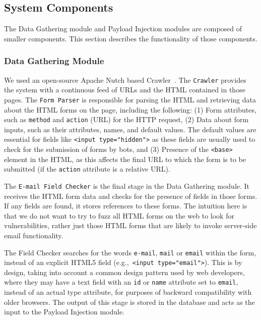 \subsection{System Components}

\label{Comp}
\label{Comp:Crawler}
\label{Comp:EMFR}
\label{Comp:Fuzzer}
\label{Comp:EMA}
The Data Gathering module and Payload Injection modules are composed of smaller components. This section describes the functionality of those components.

\subsubsection{Data Gathering Module}
We used an open-source Apache Nutch based Crawler~\cite{nutch}. The \lstinline{Crawler} provides the system with a continuous feed of URLs and the HTML contained in those pages. 
\label{Comp:FP}
The \lstinline{Form Parser} is responsible for parsing the HTML and retrieving data about the HTML
forms on the page, including the following: (1) Form attributes, such
as \lstinline{method} and \lstinline{action} (URL) for the HTTP request, (2)
Data about form inputs, such as their attributes, names, and
default values. The default values are essential for fields like
{\lstinline{<input type="hidden">}} as these fields are usually used
to check for the submission of forms by bots, and (3) Presence of the {\lstinline{<base>}} element in the HTML, as this affects the final URL to which the form is to be submitted (if the \lstinline{action} attribute is a relative URL).

\label{Comp:EMFC}
The \lstinline{E-mail Field Checker} is the final stage in the Data Gathering module. It receives the HTML form data and checks for the presence of \email fields in those forms. If any \email fields are found, it stores references to these forms.
The intuition here is that we do not want to try to fuzz all HTML forms on the web to look for \ehi vulnerabilities, rather just those HTML forms that are likely to invoke server-side email functionality.

The \Email Field Checker searches for the words \lstinline{e-mail},
\lstinline{mail} or \lstinline{email} within the form, instead of an
explicit HTML5 \email field (e.g.,\ {\lstinline{<input type="email">}}). This is by design, taking into account a common
design pattern used by web developers, where they may have a text
field with an \lstinline{id} or \lstinline{name} attribute set to
\lstinline{email}, instead of an actual \email type attribute, for
purposes of backward compatibility with older browsers. The output of this stage is stored in the database and acts as the input to the Payload Injection module.

